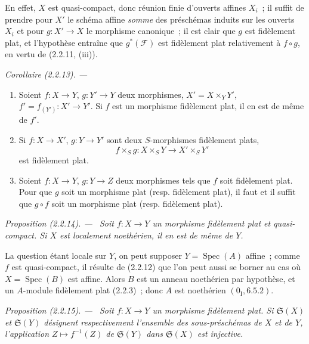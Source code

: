 \documentclass[10pt,oneside]{book}
\newcommand{\oldpage}[2][]{%
  \setcounter{footnote}{0}%
  \marginpar{\scriptsize\textbf{#1}~|~#2}\ignorespaces}
\newenvironment{proposition}[1][]{%
  \par\medskip\noindent\itshape Proposition (#1). ---\ }{\par}
\newenvironment{corollary}[1][]{%
  \par\medskip\noindent\itshape Corollaire (#1). ---\ }{\par}
\begin{document}
En effet, $X$ est quasi-compact, donc réunion finie d'ouverts affines $X_i$~;
il suffit de prendre pour $X'$ le schéma affine \emph{somme} des préschémas
induits sur les ouverts $X_i$ et
\oldpage[IV-2]{13}
pour $g:X'\to X$ le morphisme canonique~; il est clair que $g$ est fidèlement
plat, et l'hypothèse entraîne que $g^*(\mathscr F)$ est fidèlement plat
relativement à $f\circ g$, en vertu de (2.2.11, (iii)).

\begin{corollary}[2.2.13]
\label{IV.2.2.13-fr}
\begin{enumerate}
\item[(i)] Soient $f:X\to Y$, $g:Y'\to Y$ deux morphismes,
$X'=X\times_Y Y'$, $f'=f_{(Y')}:X'\to Y'$. Si $f$ est un morphisme
fidèlement plat, il en est de même de $f'$.
\item[(ii)] Si $f:X\to X'$, $g:Y\to Y'$ sont deux $S$-morphismes fidèlement
plats,
\[
f\times_S g:X\times_S Y\longrightarrow X'\times_S Y'
\]
est fidèlement plat.
\item[(iii)] Soient $f:X\to Y$, $g:Y\to Z$ deux morphismes tels que $f$ soit
fidèlement plat. Pour que $g$ soit un morphisme plat (resp. fidèlement plat),
il faut et il suffit que $g\circ f$ soit un morphisme plat (resp. fidèlement
plat).
\end{enumerate}
\end{corollary}

\begin{proposition}[2.2.14]
\label{IV.2.2.14-fr}
Soit $f:X\to Y$ un morphisme fidèlement plat et quasi-compact. Si $X$ est
localement noethérien, il en est de même de $Y$.
\end{proposition}

La question étant locale sur $Y$, on peut supposer $Y=\operatorname{Spec}(A)$
affine~; comme $f$ est quasi-compact, il résulte de (2.2.12) que l'on peut
aussi se borner au cas où $X=\operatorname{Spec}(B)$ est affine. Alors $B$
est un anneau noethérien par hypothèse, et un $A$-module fidèlement plat
(2.2.3)~; donc $A$ est noethérien $(0_{\mathrm I},6.5.2)$.

\begin{proposition}[2.2.15]
\label{IV.2.2.15-fr}
Soit $f:X\to Y$ un morphisme fidèlement plat. Si $\mathfrak S(X)$ et
$\mathfrak S(Y)$ désignent respectivement l'ensemble des sous-préschémas de
$X$ et de $Y$, l'application $Z\mapsto f^{-1}(Z)$ de $\mathfrak S(Y)$ dans
$\mathfrak S(X)$ est injective.
\end{proposition}
\end{document}
